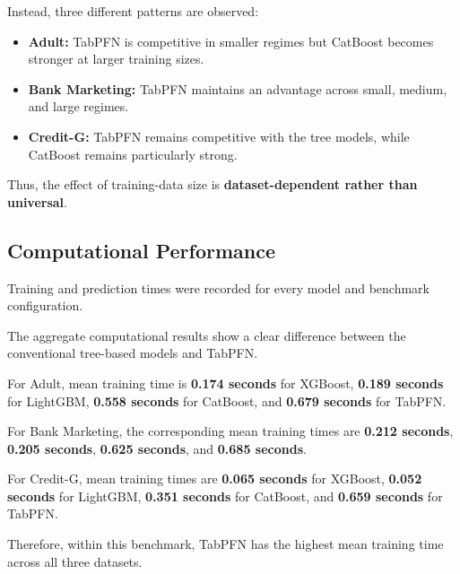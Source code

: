 Instead, three different patterns are observed:



\begin{itemize}

\item \textbf{Adult:} TabPFN is competitive in smaller regimes but CatBoost becomes stronger at larger training sizes.

\item \textbf{Bank Marketing:} TabPFN maintains an advantage across small, medium, and large regimes.

\item \textbf{Credit-G:} TabPFN remains competitive with the tree models, while CatBoost remains particularly strong.

\end{itemize}



Thus, the effect of training-data size is \textbf{dataset-dependent rather than universal}.



\subsection{Computational Performance}



Training and prediction times were recorded for every model and benchmark configuration.



The aggregate computational results show a clear difference between the conventional tree-based models and TabPFN.



For Adult, mean training time is \textbf{0.174 seconds} for XGBoost, \textbf{0.189 seconds} for LightGBM, \textbf{0.558 seconds} for CatBoost, and \textbf{0.679 seconds} for TabPFN.



For Bank Marketing, the corresponding mean training times are \textbf{0.212 seconds}, \textbf{0.205 seconds}, \textbf{0.625 seconds}, and \textbf{0.685 seconds}.



For Credit-G, mean training times are \textbf{0.065 seconds} for XGBoost, \textbf{0.052 seconds} for LightGBM, \textbf{0.351 seconds} for CatBoost, and \textbf{0.659 seconds} for TabPFN.



Therefore, within this benchmark, TabPFN has the highest mean training time across all three datasets.



